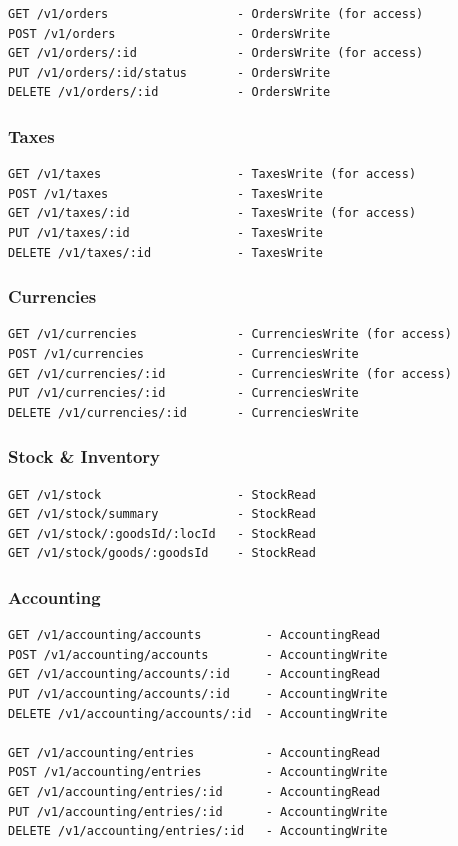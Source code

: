 \begin{verbatim}
GET /v1/orders                  - OrdersWrite (for access)
POST /v1/orders                 - OrdersWrite
GET /v1/orders/:id              - OrdersWrite (for access)
PUT /v1/orders/:id/status       - OrdersWrite
DELETE /v1/orders/:id           - OrdersWrite
\end{verbatim}

\subsubsection{Taxes}\label{taxes}

\begin{verbatim}
GET /v1/taxes                   - TaxesWrite (for access)
POST /v1/taxes                  - TaxesWrite
GET /v1/taxes/:id               - TaxesWrite (for access)
PUT /v1/taxes/:id               - TaxesWrite
DELETE /v1/taxes/:id            - TaxesWrite
\end{verbatim}

\subsubsection{Currencies}\label{currencies}

\begin{verbatim}
GET /v1/currencies              - CurrenciesWrite (for access)
POST /v1/currencies             - CurrenciesWrite
GET /v1/currencies/:id          - CurrenciesWrite (for access)
PUT /v1/currencies/:id          - CurrenciesWrite
DELETE /v1/currencies/:id       - CurrenciesWrite
\end{verbatim}

\subsubsection{Stock \& Inventory}\label{stock-inventory}

\begin{verbatim}
GET /v1/stock                   - StockRead
GET /v1/stock/summary           - StockRead
GET /v1/stock/:goodsId/:locId   - StockRead
GET /v1/stock/goods/:goodsId    - StockRead
\end{verbatim}

\subsubsection{Accounting}\label{accounting}

\begin{verbatim}
GET /v1/accounting/accounts         - AccountingRead
POST /v1/accounting/accounts        - AccountingWrite
GET /v1/accounting/accounts/:id     - AccountingRead
PUT /v1/accounting/accounts/:id     - AccountingWrite
DELETE /v1/accounting/accounts/:id  - AccountingWrite

GET /v1/accounting/entries          - AccountingRead
POST /v1/accounting/entries         - AccountingWrite
GET /v1/accounting/entries/:id      - AccountingRead
PUT /v1/accounting/entries/:id      - AccountingWrite
DELETE /v1/accounting/entries/:id   - AccountingWrite
\end{verbatim}

